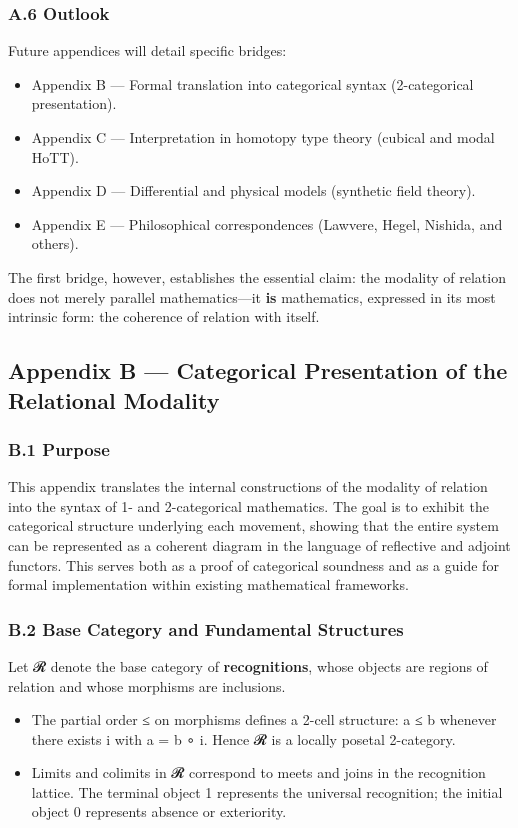 \documentclass[11pt]{article}
\begin{document}
\subsubsection*{A.6 Outlook}
\label{sec:org543e1b4}
Future appendices will detail specific bridges:
\begin{itemize}
\item Appendix B — Formal translation into categorical syntax (2-categorical presentation).
\item Appendix C — Interpretation in homotopy type theory (cubical and modal HoTT).
\item Appendix D — Differential and physical models (synthetic field theory).
\item Appendix E — Philosophical correspondences (Lawvere, Hegel, Nishida, and others).
\end{itemize}

The first bridge, however, establishes the essential claim:  
the modality of relation does not merely parallel mathematics—it \textbf{is} mathematics,  
expressed in its most intrinsic form: the coherence of relation with itself.
\subsection*{Appendix B — Categorical Presentation of the Relational Modality}
\label{sec:orgf5e72bc}

\subsubsection*{B.1 Purpose}
\label{sec:org158c348}
This appendix translates the internal constructions of the modality of relation  
into the syntax of 1- and 2-categorical mathematics.  
The goal is to exhibit the categorical structure underlying each movement,  
showing that the entire system can be represented  
as a coherent diagram in the language of reflective and adjoint functors.  
This serves both as a proof of categorical soundness  
and as a guide for formal implementation within existing mathematical frameworks.
\subsubsection*{B.2 Base Category and Fundamental Structures}
\label{sec:orga78a3d8}
Let 𝓡 denote the base category of \textbf{recognitions},  
whose objects are regions of relation and whose morphisms are inclusions.

\begin{itemize}
\item The partial order ≤ on morphisms defines a 2-cell structure:
a ≤ b whenever there exists i with a = b ∘ i.  
Hence 𝓡 is a locally posetal 2-category.

\item Limits and colimits in 𝓡 correspond to meets and joins in the recognition lattice.  
The terminal object 1 represents the universal recognition;  
the initial object 0 represents absence or exteriority.
\end{itemize}
\end{document}
